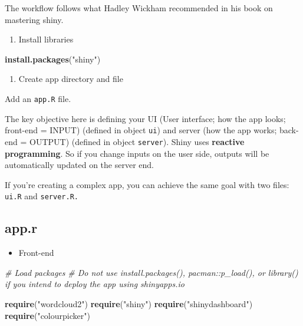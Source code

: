 \documentclass[
]{book}
\newenvironment{Shaded}{\begin{snugshade}}{\end{snugshade}}
\newcommand{\CommentTok}[1]{\textcolor[rgb]{0.56,0.35,0.01}{\textit{#1}}}
\newcommand{\FunctionTok}[1]{\textcolor[rgb]{0.13,0.29,0.53}{\textbf{#1}}}
\newcommand{\NormalTok}[1]{#1}
\newcommand{\StringTok}[1]{\textcolor[rgb]{0.31,0.60,0.02}{#1}}
\providecommand{\tightlist}{%
  \setlength{\itemsep}{0pt}\setlength{\parskip}{0pt}}
\begin{document}
The workflow follows what Hadley Wickham recommended in his book on mastering shiny.

\begin{enumerate}
\def\labelenumi{\arabic{enumi}.}
\tightlist
\item
  Install libraries
\end{enumerate}

\begin{Shaded}
\begin{Highlighting}[]
\FunctionTok{install.packages}\NormalTok{(}\StringTok{"shiny"}\NormalTok{)}
\end{Highlighting}
\end{Shaded}

\begin{enumerate}
\def\labelenumi{\arabic{enumi}.}
\setcounter{enumi}{1}
\tightlist
\item
  Create app directory and file
\end{enumerate}

Add an \texttt{app.R} file.

The key objective here is defining your UI (User interface; how the app looks; front-end = INPUT) (defined in object \texttt{ui}) and server (how the app works; back-end = OUTPUT) (defined in object \texttt{server}). Shiny uses \textbf{reactive programming}. So if you change inputs on the user side, outputs will be automatically updated on the server end.

If you're creating a complex app, you can achieve the same goal with two files: \texttt{ui.R} and \texttt{server.R.}

\subsection{app.r}\label{app.r}

\begin{itemize}
\tightlist
\item
  Front-end
\end{itemize}

\begin{Shaded}
\begin{Highlighting}[]
\CommentTok{\# Load packages }
\CommentTok{\# Do not use install.packages(), pacman::p\_load(), or library() if you intend to deploy the app using shinyapps.io }

\FunctionTok{require}\NormalTok{(}\StringTok{"wordcloud2"}\NormalTok{)}
\FunctionTok{require}\NormalTok{(}\StringTok{"shiny"}\NormalTok{)}
\FunctionTok{require}\NormalTok{(}\StringTok{"shinydashboard"}\NormalTok{)}
\FunctionTok{require}\NormalTok{(}\StringTok{"colourpicker"}\NormalTok{)}
\end{Highlighting}
\end{Shaded}
\end{document}
